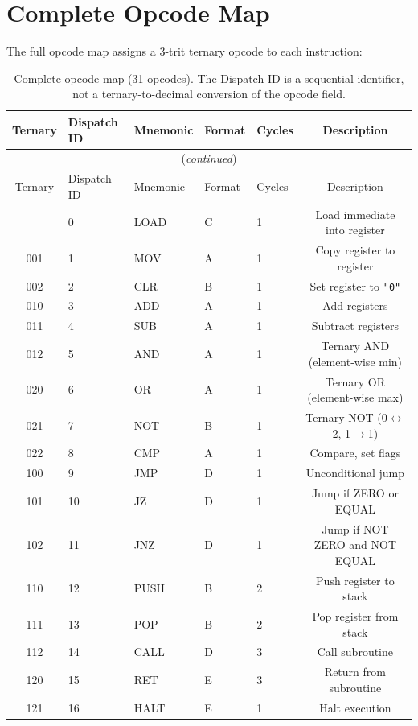 \documentclass[10pt,a4paper,twoside]{book}
\begin{document}
\section{Complete Opcode Map}

The full opcode map assigns a 3-trit ternary opcode to each instruction:

\begin{longtable}{cllllc}
\caption{Complete opcode map (31 opcodes). The Dispatch ID is a sequential identifier, not a ternary-to-decimal conversion of the opcode field.}
\label{tab:opcodelong} \\
\toprule
Ternary & Dispatch ID & Mnemonic & Format & Cycles & Description \\
\midrule
\endfirsthead
\multicolumn{6}{c}{(\emph{continued})} \\
\toprule
Ternary & Dispatch ID & Mnemonic & Format & Cycles & Description \\
\midrule
\endhead
\bottomrule
\endfoot
000 & 0  & LOAD    & C  & 1 & Load immediate into register \\
001 & 1  & MOV     & A  & 1 & Copy register to register \\
002 & 2  & CLR     & B  & 1 & Set register to \texttt{"0"} \\
010 & 3  & ADD     & A  & 1 & Add registers \\
011 & 4  & SUB     & A  & 1 & Subtract registers \\
012 & 5  & AND     & A  & 1 & Ternary AND (element-wise min) \\
020 & 6  & OR      & A  & 1 & Ternary OR (element-wise max) \\
021 & 7  & NOT     & B  & 1 & Ternary NOT (0$\leftrightarrow$2, 1$\rightarrow$1) \\
022 & 8  & CMP     & A  & 1 & Compare, set flags \\
100 & 9  & JMP     & D  & 1 & Unconditional jump \\
101 & 10 & JZ      & D  & 1 & Jump if ZERO or EQUAL \\
102 & 11 & JNZ     & D  & 1 & Jump if NOT ZERO and NOT EQUAL \\
110 & 12 & PUSH    & B  & 2 & Push register to stack \\
111 & 13 & POP     & B  & 2 & Pop register from stack \\
112 & 14 & CALL    & D  & 3 & Call subroutine \\
120 & 15 & RET     & E  & 3 & Return from subroutine \\
121 & 16 & HALT    & E  & 1 & Halt execution \\

\end{longtable}
\end{document}
